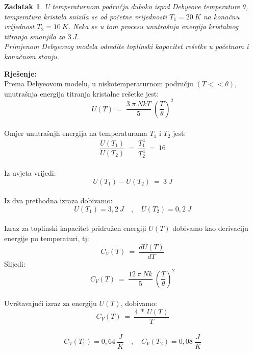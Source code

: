 \documentclass[a4paper,12pt]{article}
\newtheorem{ZDK}{Zadatak}[section]
\begin{document}
\newpage
\begin{ZDK}
	U temperaturnom podru\v{c}ju duboko ispod Debyeove temperature $\theta$, temperatura kristala snizila se od po\v{c}etne vrijednosti $T_1=20\ K$ 
	na kona\v{c}nu vrijednost $T_2=10\ K$. Neka se u tom procesu unutra\v{s}nja energija kristalnog titranja smanjila za $3\ J$. \\
	Primjenom Debyeovog modela odredite toplinski kapacitet re\v{s}etke u po\v{c}etnom i kona\v{c}nom stanju.
\end{ZDK}
\textbf{Rje\v{s}enje:} \\
\newline
Prema Debyeovom modelu, u niskotemperaturnom podru\v{c}ju $(T << \theta)$, unutra\v{s}nja energija titranja kristalne re\v{s}etke jest:
$$ U(T)\ =\ \frac{3\ \pi\ NkT}{5}\ \left( \frac{T}{\theta} \right)^2 $$
\\
Omjer unutra\v{s}njh energija na temperaturama $T_1$ i $T_2$ jest:
\\
$$ \frac{U(T_1)}{U(T_2)}\ =\ \frac{T_1^4}{T_2^4}\ =\ 16 $$
\\
Iz uvjeta vrijedi:
$$ U(T_1)-U(T_2)\ =\ 3\ J $$
\\
Iz dva prethodna izraza dobivamo:
$$ U(T_1)=3,2\ J \quad , \quad U(T_2)=0,2\ J $$
\\
Izraz za toplinski kapacitet pridru\v{z}en energiji $U(T)$ dobivamo kao derivaciju energije po temperaturi, tj:
$$ C_V(T)\ =\ \frac{dU(T)}{dT} $$
Slijedi:
$$ C_V(T)\ =\ \frac{12\ \pi\ Nk}{5}\ \left( \frac{T}{\theta} \right)^2 $$
\\
Uvr\v{s}tavaju\'ci izraz za energiju $U(T)$, dobivamo:
\\
$$ C_V(T)\ =\ \frac{4\ *\ U(T)}{T} $$
\\
$$ C_V(T_1)=0,64\ \frac{J}{K} \quad , \quad C_V(T_2)=0,08\ \frac{J}{K} $$
\end{document}
